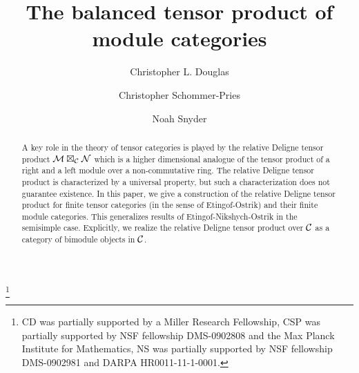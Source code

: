 \documentclass{amsart}
\begin{document}
\title{The balanced tensor product of module categories}

\begin{abstract}
A key role in the theory of tensor categories is played by the relative Deligne tensor product $\mathcal M \boxtimes_\mathcal C \mathcal N$ which is a higher dimensional analogue of the tensor product of a right and a left module over a non-commutative ring.  The relative Deligne tensor product is characterized by a universal property, but such a characterization does not guarantee existence.  In this paper, we give a construction of the relative Deligne tensor product for finite tensor categories (in the sense of Etingof-Ostrik) and their finite module categories.  This generalizes results of Etingof-Nikshych-Ostrik in the semisimple case.  Explicitly, we realize the relative Deligne tensor product over $\mathcal C$ as a category of bimodule objects in $\mathcal C$.
\end{abstract}

\author{Christopher L. Douglas}
\address{Mathematical Institute\\ University of Oxford\\ Oxford OX1 3LB\\ United Kingdom}
      	
\author{Christopher Schommer-Pries}
\address{Department of Mathematics\\ Max Planck Institute for Mathematics \\ 53111 Bonn \\ Germany}

\author{Noah Snyder}
\address{Department of Mathematics\\ Indiana University\\ Bloomington, IN 47401\\ USA}

\thanks{CD was partially supported by a Miller Research Fellowship, CSP was partially supported by NSF fellowship DMS-0902808 and the Max Planck Institute for Mathematics,  NS was partially supported by NSF fellowship DMS-0902981 and DARPA HR0011-11-1-0001.
}


\maketitle	
\end{document}
